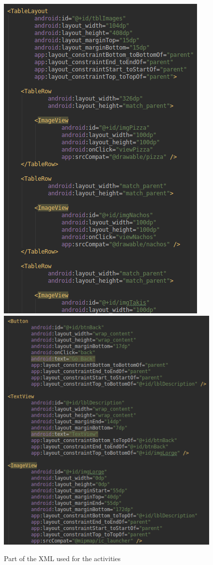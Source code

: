 \documentclass{scrartcl}
\begin{document}
\begin{figure}[h]
    \includegraphics[scale=0.4]{images/screen2.png}
    \includegraphics[scale=0.4]{images/screen3.png}
    \caption{Part of the XML used for the activities}
\end{figure}
\end{document}
